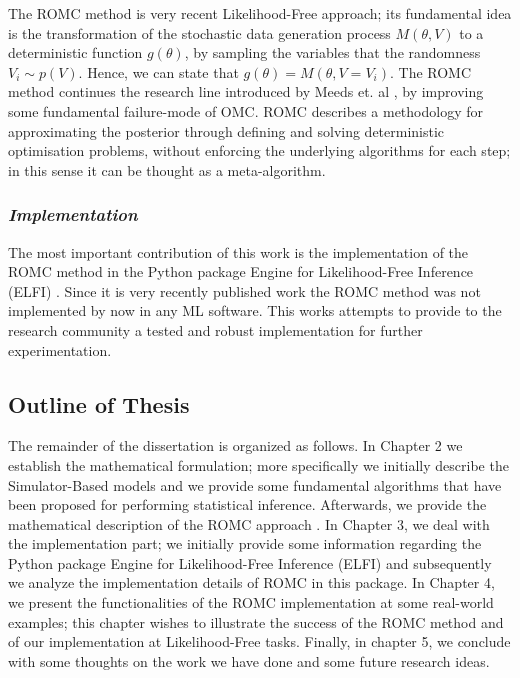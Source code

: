 \documentclass[11pt,twoside]{article}
\numberwithin{Theorem}{section}
\numberwithin{Definition}{section}
\numberwithin{Lemma}{section}
\numberwithin{Algorithm}{section}
\numberwithin{equation}{section}
\begin{document}
The ROMC method \cite{Ikonomov2019} is very recent Likelihood-Free approach; its fundamental idea is the transformation of the stochastic data generation process $M(\theta, V)$ to a deterministic function $g(\theta)$, by sampling the variables that the randomness $V_i \sim p(V)$. Hence, we can state that $g(\theta) = M(\theta, V=V_i)$. The ROMC method continues the research line introduced by Meeds et. al \cite{Meeds2015}, by improving some fundamental failure-mode of OMC. ROMC describes a methodology for approximating the posterior through defining and solving deterministic optimisation problems, without enforcing the underlying algorithms for each step; in this sense it can be thought as a meta-algorithm.

\subsubsection*{\textit{Implementation}}

The most important contribution of this work is the implementation of the ROMC method in the Python package Engine for Likelihood-Free Inference (ELFI) \cite{1708.00707}. Since it is very recently published work the ROMC method was not implemented by now in any ML software. This works attempts to provide to the research community a tested and robust implementation for further experimentation.

\subsection{Outline of Thesis}

The remainder of the dissertation is organized as follows. In Chapter 2 we establish the mathematical formulation; more specifically we initially describe the Simulator-Based models and we provide some fundamental algorithms that have been proposed for performing statistical inference. Afterwards, we provide the mathematical description of the ROMC approach \cite{Ikonomov2019}. In Chapter 3, we deal with the implementation part; we initially provide some information regarding the Python package Engine for Likelihood-Free Inference (ELFI) \cite{1708.00707} and subsequently we analyze the implementation details of ROMC in this package. In Chapter 4, we present the functionalities of the ROMC implementation at some real-world examples; this chapter wishes to illustrate the success of the ROMC method and of our implementation at Likelihood-Free tasks. Finally, in chapter 5, we conclude with some thoughts on the work we have done and some future research ideas.
\end{document}
